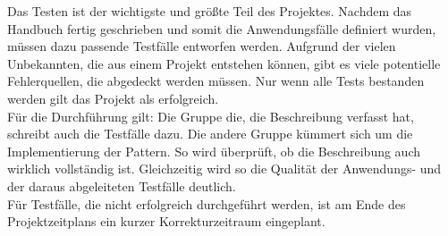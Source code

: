 Das Testen ist der wichtigste und größte Teil des Projektes. Nachdem das Handbuch fertig
geschrieben und somit die Anwendungsfälle definiert wurden, müssen dazu passende Testfälle
entworfen werden. Aufgrund der vielen Unbekannten, die aus einem Projekt entstehen können,
gibt es viele potentielle Fehlerquellen, die abgedeckt werden müssen. Nur wenn alle Tests 
bestanden werden gilt das Projekt als erfolgreich.\\
Für die Durchführung gilt: Die Gruppe die, die Beschreibung verfasst hat,
schreibt auch die Testfälle dazu. Die andere Gruppe kümmert sich um die
Implementierung der Pattern. So wird überprüft, ob die Beschreibung auch
wirklich vollständig ist. Gleichzeitig wird so die Qualität der Anwendungs- und
der daraus abgeleiteten Testfälle deutlich.\\
Für Testfälle, die nicht erfolgreich durchgeführt werden, ist am Ende des Projektzeitplans
ein kurzer Korrekturzeitraum eingeplant. 